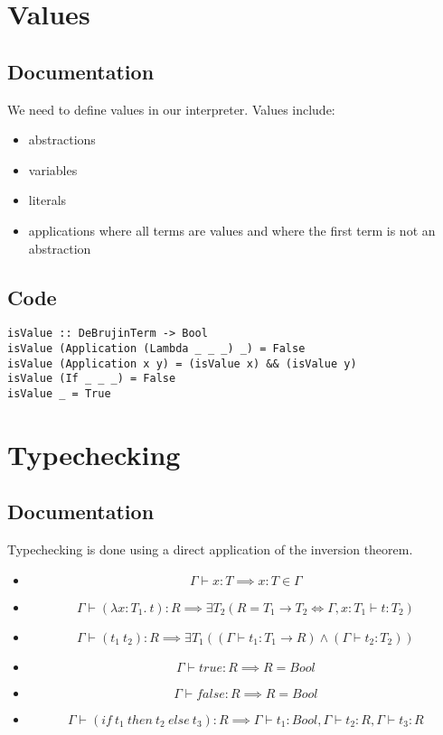 \documentclass[11pt]{article}
\begin{document}
\section{Values}
\label{sec-8}
\subsection{Documentation}
\label{sec-8-1}
We need to define values in our interpreter. Values include:
\begin{itemize}
\item abstractions
\item variables
\item literals
\item applications where all terms are values and where the first term is not an abstraction
\end{itemize}

\subsection{Code}
\label{sec-8-2}
\begin{verbatim}
isValue :: DeBrujinTerm -> Bool
isValue (Application (Lambda _ _ _) _) = False
isValue (Application x y) = (isValue x) && (isValue y)
isValue (If _ _ _) = False
isValue _ = True
\end{verbatim}


\section{Typechecking}
\label{sec-9}
\subsection{Documentation}
\label{sec-9-1}
Typechecking is done using a direct application of the inversion theorem.

\begin{itemize}
\item \[\Gamma \vdash x: T \implies x:T \in \Gamma\]

\item \[\Gamma \vdash (\lambda x:T_1.\ t): R \implies \exists T_2(R = T_1 \to T_2 \iff \Gamma, x:T_1 \vdash t:T_2)\]

\item \[\Gamma \vdash (t_1\ t_2): R \implies \exists T_1((\Gamma \vdash t_1: T_1 \to R) \wedge (\Gamma \vdash t_2: T_2))\]

\item \[\Gamma \vdash true: R \implies R = Bool\]

\item \[\Gamma \vdash false: R \implies R = Bool\]

\item \[\Gamma \vdash (if\ t_1\ then\ t_2\ else\ t_3): R \implies \Gamma \vdash t_1: Bool, \Gamma \vdash t_2: R, \Gamma \vdash t_3: R\]
\end{itemize}
\end{document}
